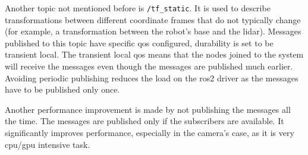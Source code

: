 Another topic not mentioned before is \texttt{/tf\_static}. It is used to describe transformations between different coordinate frames that do not typically change (for example, a transformation between the robot's base and the \ac{lidar}). Messages published to this topic have specific \ac{qos} configured, durability is set to be transient local. The transient local \ac{qos} means that the nodes joined to the system will receive the messages even though the messages are published much earlier. Avoiding periodic publishing reduces the load on the \ac{ros2} driver as the messages have to be published only once.

Another performance improvement is made by not publishing the messages all the time. The messages are published only if the subscribers are available. It significantly improves performance, especially in the camera's case, as it is very \acs{cpu}/\acs{gpu} intensive task.

